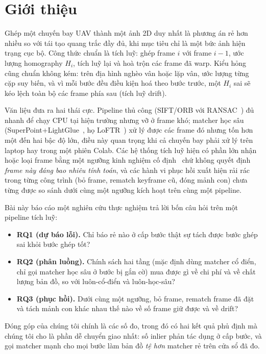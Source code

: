 \documentclass[conference]{IEEEtran}
\begin{document}
\section{Giới thiệu}
Ghép một chuyến bay UAV thành một ảnh 2D duy nhất là phương án rẻ hơn nhiều so
với tái tạo quang trắc đầy đủ, khi mục tiêu chỉ là một bức ảnh hiện trạng cục
bộ. Công thức chuẩn là tích luỹ: ghép frame $i$ với frame $i-1$, ước lượng
homography $H_i$, tích luỹ lại và hoà trộn các frame đã warp. Kiểu hỏng cũng
chuẩn không kém: trên địa hình nghèo vân hoặc lặp vân, ước lượng từng cặp suy
biến, và vì mỗi bước đều điều kiện hoá theo bước trước, một $H_i$ sai sẽ kéo
lệch toàn bộ các frame phía sau (tích luỹ drift).

Văn liệu đưa ra hai thái cực. Pipeline thủ công (SIFT/ORB với
RANSAC~\cite{lowe2004,rublee2011,fischler1981}) đủ nhanh để chạy CPU tại hiện
trường nhưng vỡ ở frame khó; matcher học sâu
(SuperPoint+LightGlue~\cite{detone2018,lindenberger2023}, họ
LoFTR~\cite{sun2021,wang2024}) xử lý được các frame đó nhưng tốn hơn một đến
hai bậc độ lớn, điều này quan trọng khi cả chuyến bay phải xử lý trên laptop
hay trong một phiên Colab. Các hệ thống tích luỹ hiện có phần lớn nhận hoặc
loại frame bằng một ngưỡng kinh nghiệm cố định~\cite{hwang2026,li2023} chứ
không quyết định \emph{frame này đáng bao nhiêu tính toán}, và các hành vi phục
hồi xuất hiện rải rác trong từng công trình (bỏ frame, rematch keyframe cũ,
đóng mảnh con) chưa từng được so sánh dưới cùng một ngưỡng kích hoạt trên cùng
một pipeline.

Bài này báo cáo một nghiên cứu thực nghiệm trả lời bốn câu hỏi trên một
pipeline tích luỹ:
\begin{itemize}
\item \textbf{RQ1 (dự báo lỗi).} Chỉ báo rẻ nào ở cấp bước thật sự tách được
bước ghép sai khỏi bước ghép tốt?
\item \textbf{RQ2 (phân luồng).} Chính sách hai tầng (mặc định dùng matcher
cổ điển, chỉ gọi matcher học sâu ở bước bị gắn cờ) mua được gì về chi phí và
về chất lượng bản đồ, so với luôn-cổ-điển và luôn-học-sâu?
\item \textbf{RQ3 (phục hồi).} Dưới cùng một ngưỡng, bỏ frame, rematch frame đã
đặt và tách mảnh con khác nhau thế nào về số frame giữ được và về drift?
\end{itemize}
Đóng góp của chúng tôi chính là các số đo, trong đó có hai kết quả phủ định mà
chúng tôi cho là phần dễ chuyển giao nhất: số inlier phản tác dụng ở cấp bước,
và gọi matcher mạnh cho mọi bước làm bản đồ \emph{tệ hơn} matcher rẻ trên cửa
sổ đã đo.
\end{document}
